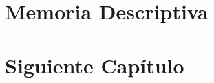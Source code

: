 \documentclass[12pt,a4paper,oneside]{report}
\begin{document}
	

	\begin{titlepage}
		
	\end{titlepage}
	
	
	\chapter*{}
	
	
	
	\chapter*{}
	
	
	\tableofcontents
	
	\chapter{Memoria Descriptiva}
	
	
	\chapter{Siguiente Capítulo}
	
	

	 
	
	\renewcommand*{\bibname}{Bibliografía}
	\newpage
\end{document}
